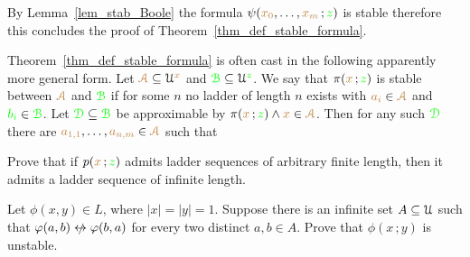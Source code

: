 




By Lemma~\ref{lem_stab_Boole} the formula $\psi({\color{brown} x_0},\dots,{\color{brown} x_m}\,;{\color{green} z})$ is stable therefore this concludes the proof of Theorem~\ref{thm_def_stable_formula}.

\begin{remark}\label{rem_sability_no_compactness}
  Theorem~\ref{thm_def_stable_formula} is often cast in the following  apparently more general form.
  Let ${\color{brown}\EuScript A}\subseteq\EuScript U^{\color{brown} x}$ and ${\color{green}\EuScript B}\subseteq\EuScript U^{\color{green} z}$.
  We say that $\pi({\color{brown} x}\,;{\color{green} z})$ is stable between ${\color{brown}\EuScript A}$ and ${\color{green}\EuScript B}$ if for some $n$ no ladder of length $n$ exists with ${\color{brown} a_i}\in{\color{brown}\EuScript A}$ and ${\color{green} b_i}\in{\color{green}\EuScript B}$.
  Let ${\color{green}\EuScript D}\subseteq{\color{green}\EuScript B}$ be approximable by $\pi({\color{brown} x}\,;{\color{green} z})\wedge {\color{brown}x}\in{\color{brown}\EuScript A}$.
  Then for any such ${\color{green}\EuScript D}$ there are ${\color{brown} a_{1,1}},\dots,{\color{brown} a_{n,m}}\in {\color{brown}\EuScript A}$ such that 
  
\end{remark} 


\begin{exercise}
  Prove that if $p({\color{brown} x}\,;{\color{green} z})$ admits ladder sequences of arbitrary finite length, then it admits a ladder sequence of infinite length.
\end{exercise}

\begin{exercise}
  Let $\phi(x,y)\in  L$, where $|x|=|y|=1$.
  Suppose there is an infinite set $A\subseteq\EuScript U$ such that $\phi(a,b)\niff\phi(b,a)$ for every two distinct $a,b\in A$.
  Prove that $\phi(x\,;y)$ is unstable.
\end{exercise}


